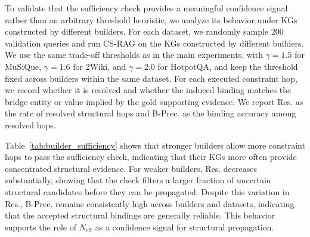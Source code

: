 \documentclass{article}
\theoremstyle{plain}
\theoremstyle{definition}
\theoremstyle{remark}
\begin{document}
To validate that the sufficiency check provides a meaningful confidence signal rather than an arbitrary threshold heuristic, we analyze its behavior under KGs constructed by different builders.
For each dataset, we randomly sample 200 validation queries and run CS-RAG on the KGs constructed by different builders.
We use the same trade-off thresholds as in the main experiments, with \(\gamma=1.5\) for MuSiQue, \(\gamma=1.6\) for 2Wiki, and \(\gamma=2.0\) for HotpotQA, and keep the threshold fixed across builders within the same dataset.
For each executed constraint hop, we record whether it is resolved and whether the induced binding matches the bridge entity or value implied by the gold supporting evidence.
We report Res. as the rate of resolved structural hops and B-Prec. as the binding accuracy among resolved hops.

Table~\ref{tab:builder_sufficiency} shows that stronger builders allow more constraint hops to pass the sufficiency check, indicating that their KGs more often provide concentrated structural evidence.
For weaker builders, Res. decreases substantially, showing that the check filters a larger fraction of uncertain structural candidates before they can be propagated.
Despite this variation in Res., B-Prec. remains consistently high across builders and datasets, indicating that the accepted structural bindings are generally reliable.
This behavior supports the role of $N_{\mathrm{eff}}$ as a confidence signal for structural propagation.



\begin{table}[h]
\centering
\caption{Resolved-hop rates and binding precision across KG builders on three datasets.}
\label{tab:builder_sufficiency}
\end{table}
\end{document}
